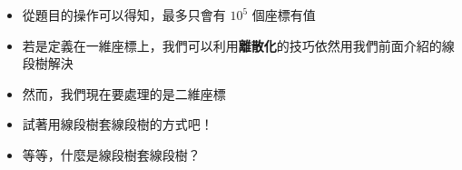 \documentclass[standalone]{beamer}
\begin{document}
\begin{frame}[fragile]{}
  \begin{itemize}
    \item 從題目的操作可以得知，最多只會有 $10^5$ 個座標有值
    \item 若是定義在一維座標上，我們可以利用\textbf{離散化}的技巧依然用我們前面介紹的線段樹解決
  \end{itemize}
\end{frame}

\begin{frame}[fragile]{}
  \begin{itemize}    
    \item 然而，我們現在要處理的是二維座標
    \item 試著用線段樹套線段樹的方式吧！
    \item 等等，什麼是線段樹套線段樹？
  \end{itemize}
\end{frame}
\end{document}
